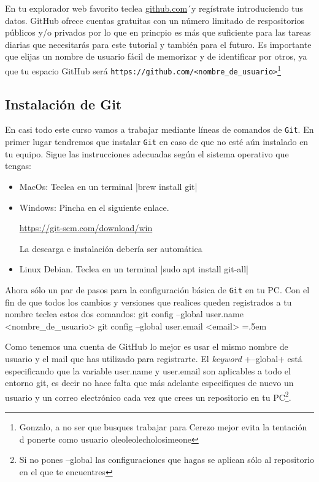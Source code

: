 \documentclass[a4paper,10pt]{article}
\newenvironment{cverbatim}
 {\SaveVerbatim{cverb}}
 {\endSaveVerbatim
  \flushleft\fboxrule=0pt\fboxsep=.5em
  \colorbox{bg}{\BUseVerbatim{cverb}}%
  \endflushleft
}
\begin{document}
    En tu explorador web favorito teclea \url{github.com}´y regístrate introduciendo tus datos. GitHub ofrece cuentas gratuitas con un número limitado de respositorios públicos y/o privados por lo que en princpio es más que suficiente para las tareas diarias que necesitarás para este tutorial y también para el futuro. Es importante que elijas un nombre de usuario fácil de memorizar y de identificar por otros, ya que tu espacio GitHub será \verb+https://github.com/<nombre_de_usuario>+\footnote{Gonzalo, a no ser que busques trabajar para Cerezo mejor evita la tentación d ponerte como usuario oleoleolecholosimeone}
    
  \subsection{Instalación de Git}
    En casi todo este curso vamos a trabajar mediante líneas de comandos de \verb+Git+. En primer lugar tendremos que instalar \verb+Git+ en caso de que no esté aún instalado en tu equipo. Sigue las instrucciones adecuadas según el sistema operativo que tengas: 
    
    \begin{itemize}
      \item MacOs: Teclea en un terminal
        \cverb|brew install git|

      \item Windows: Pincha en el siguiente enlace. 
      
      \url{https://git-scm.com/download/win}
      
      La descarga e instalación debería ser automática
        
      \item Linux Debian. Teclea en un terminal
        \cverb|sudo apt install git-all|
    \end{itemize}
    Ahora sólo un par de pasos para la configuración básica de \verb+Git+ en tu PC. Con el fin de que todos los cambios y versiones que realices queden registrados a tu nombre teclea estos dos comandos:
    \begin{cverbatim}
git config --global user.name <nombre_de_usuario>
git config --global user.email <email>
    \end{cverbatim}
      
    Como tenemos una cuenta de GitHub lo mejor es usar el mismo nombre de usuario y el mail que has utilizado para registrarte. El \emph{keyword} \cverb+--global+ está especificando que la variable user.name y user.email son aplicables a todo el entorno git, es decir no hace falta que más adelante especifiques de nuevo un usuario y un correo electrónico cada vez que crees un repositorio en tu PC\footnote{Si no pones --global las configuraciones que hagas se aplican sólo al repositorio en el que te encuentres}.
\end{document}
